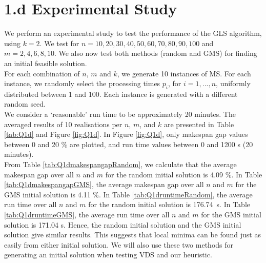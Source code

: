 \documentclass[12pt,a4paper,reqno]{article}
\begin{document}
\section*{1.d Experimental Study}
We perform an experimental study to test the performance of the GLS algorithm, using $k=2$. We test for $n=10,20,30,40,50,60,70,80,90,100$ and $m=2,4,6,8,10$. We also now test both methods (random and GMS) for finding an initial feasible solution. \\

For each combination of $n$, $m$ and $k$, we generate 10 instances of MS. For each instance, we randomly select the processing times $p_i$, for $i=1,...,n$, uniformly distributed between 1 and 100. Each instance is generated with a different random seed. \\

We consider a `reasonable' run time to be approximately 20 minutes. The averaged results of 10 realisations per $n$, $m$, and $k$ are presented in Table \ref{tab:Q1d} and Figure \ref{fig:Q1d}. In Figure \ref{fig:Q1d}, only makespan gap values between 0 and 20 \% are plotted, and run time values between 0 and 1200 s (20 minutes). \\

From Table \ref{tab:Q1dmakespangapRandom}, we calculate that the average makespan gap over all $n$ and $m$ for the random initial solution is 4.09 \%. In Table \ref{tab:Q1dmakespangapGMS}, the average makespan gap over all $n$ and $m$ for the GMS initial solution is 4.11 \%. In Table \ref{tab:Q1druntimeRandom}, the average run time over all $n$ and $m$ for the random initial solution is 176.74~s. In Table \ref{tab:Q1druntimeGMS}, the average run time over all $n$ and $m$ for the GMS initial solution is 171.04 s. Hence, the random initial solution and the GMS initial solution give similar results. This suggests that local minima can be found just as easily from either initial solution. We will also use these two methods for generating an initial solution when testing VDS and our heuristic.
\end{document}
